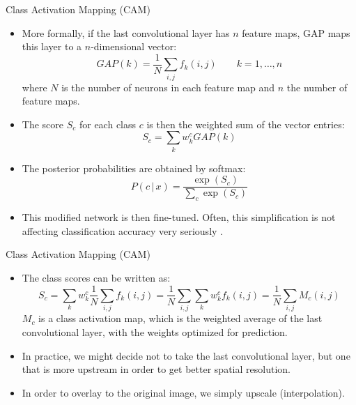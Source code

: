 \documentclass[xcolor=pdftex,dvipsnames,table]{beamer}
\begin{document}
\begin{frame}{Class Activation Mapping (CAM)}
\begin{itemize}
\item More formally, if the last convolutional layer has $n$ feature maps, GAP maps this layer to a $n$-dimensional vector: 
\begin{equation}
	GAP(k) = \frac{1}{N}\sum_{i,j}f_k(i,j) \quad \quad k = 1, \ldots, n
\end{equation}
where $N$ is the number of neurons in each feature map and $n$ the number of feature maps.
\item The score $S_c$ for each class $c$ is then the weighted sum of the vector entries:
\begin{equation}
	S_c = \sum_k w_k^c GAP(k)
\end{equation}
\item The posterior probabilities are obtained by softmax:
\begin{equation}
	P(c \, | \, x) = \frac{\exp{(S_c)}}{\sum_c \exp{(S_c)}}
\end{equation}
\item This modified network is then fine-tuned. Often, this simplification is not affecting classification accuracy very seriously \cite{Zhou:2016}. 
\end{itemize}
\end{frame}

\begin{frame}{Class Activation Mapping (CAM)}
\begin{itemize}
	\item The class scores can be written as:
	\begin{equation}
	S_c = \sum_k w_k^c \frac{1}{N}\sum_{i,j}f_k(i,j) = \frac{1}{N}\sum_{i,j} \sum_k w_k^c f_k(i,j) = \frac{1}{N}\sum_{i,j} M_c(i,j)
	\end{equation}
	$M_c$ is a class activation map, which is the weighted average of the last convolutional layer, with the weights optimized for prediction. 
	\item In practice, we might decide not to take the last convolutional layer, but one that is more upstream in order to get better spatial resolution. 
	\item In order to overlay to the original image, we simply upscale (interpolation). 
\end{itemize}
\end{frame}
\end{document}
